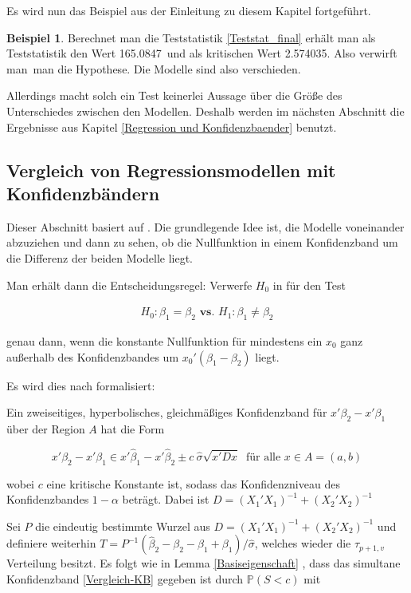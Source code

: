 \documentclass[12pt,a4paper]{article}
\theoremstyle{definition}
\newtheorem{Beispiel}[Definition]{Beispiel}
\theoremstyle{definition}
\theoremstyle{definition}
\theoremstyle{definition}
\newcommand{\TestWert}{165.0847}%
\newcommand{\kritWert}{2.574035}%
\newcommand{\EntscheidungHypothesen}{verwirft man}
\newcommand{\Modellesind}{verschieden}
\begin{document}
Es wird nun das Beispiel aus der Einleitung zu diesem Kapitel fortgeführt.

\begin{Beispiel}
Berechnet man die Teststatistik \eqref{Teststat_final} erhält man als Teststatistik den Wert \TestWert ~und als kritischen Wert \kritWert . Also \EntscheidungHypothesen ~man die Hypothese. Die Modelle sind also \Modellesind .
\end{Beispiel}

Allerdings macht solch ein Test keinerlei Aussage über die Größe des Unterschiedes zwischen den Modellen. Deshalb werden im nächsten Abschnitt die Ergebnisse aus Kapitel \ref{Regression und Konfidenzbaender} benutzt.


\subsection{Vergleich von Regressionsmodellen mit Konfidenzbändern}
\label{Konfidenzbaender vergleich}
Dieser Abschnitt basiert auf \cite[119-121]{Liu64}.
Die grundlegende Idee ist, die Modelle voneinander abzuziehen und dann zu sehen, ob die Nullfunktion in einem Konfidenzband um die Differenz der beiden Modelle liegt.

Man erhält dann die Entscheidungsregel: Verwerfe $H_0$ in für den Test

\begin{align*}
H_{0} : \beta_1 = \beta_2  \textbf{ vs. }  H_{1} : \beta_1 \neq \beta_2 
\end{align*}

genau dann, wenn die konstante Nullfunktion für mindestens ein $x_{0}$ ganz außerhalb des Konfidenzbandes um $x_{0}' (\beta_1 - \beta_2)$  liegt.

Es wird dies nach \cite[122]{Liu64} formalisiert: 

Ein zweiseitiges, hyperbolisches, gleichmäßiges Konfidenzband für $x'\beta_2 - x'\beta_1$ über der Region $A$ hat die Form

\begin{equation} \label{Vergleich-KB}
x'\beta_2-x'\beta_1 \in x' \hat{\beta}_1 - x' \hat{\beta}_2 \pm c ~ \hat{\sigma} \sqrt{x' D x} ~ \text{ für alle } x \in A = (a,b)
\end{equation}

wobei $c$ eine kritische Konstante ist, sodass das Konfidenzniveau des Konfidenzbandes $1-\alpha$ beträgt. Dabei ist $D = (X_1'X_1)^{-1} + (X_2'X_2)^{-1}$

Sei $P$ die eindeutig bestimmte Wurzel aus $D = (X_1'X_1)^{-1} + (X_2'X_2)^{-1}$ und definiere weiterhin $T=P^{-1}(\hat{\beta}_2 - \beta_2 - \hat{\beta}_1 + \beta_1)/\hat{\sigma}$, welches wieder die $\tau_{p+1,v}$ Verteilung besitzt. Es folgt wie in Lemma \ref{Basiseigenschaft} , dass das simultane Konfidenzband \eqref{Vergleich-KB} gegeben ist durch $\mathbb{P}(S<c)$ mit
\end{document}
